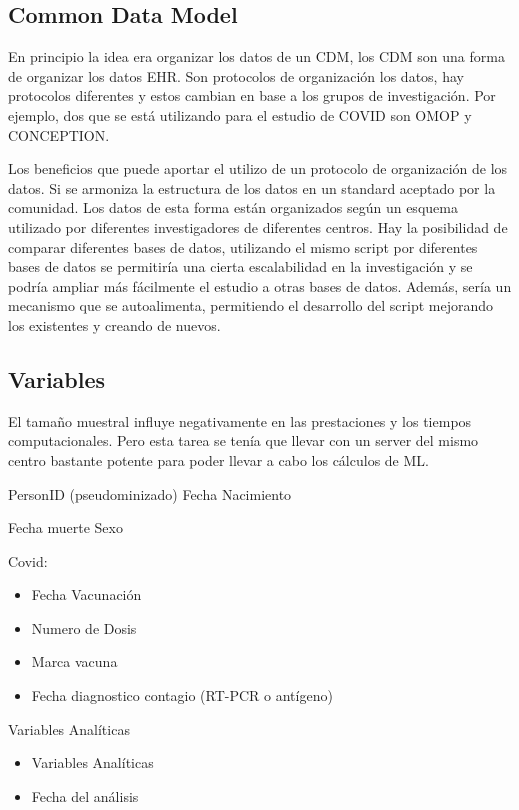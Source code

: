 \documentclass[
]{article}
\begin{document}
\hypertarget{common-data-model}{%
\subsection{Common Data Model}\label{common-data-model}}

En principio la idea era organizar los datos de un CDM, los CDM son una
forma de organizar los datos EHR. Son protocolos de organización los
datos, hay protocolos diferentes y estos cambian en base a los grupos de
investigación. Por ejemplo, dos que se está utilizando para el estudio
de COVID son OMOP y CONCEPTION.

Los beneficios que puede aportar el utilizo de un protocolo de
organización de los datos. Si se armoniza la estructura de los datos en
un standard aceptado por la comunidad. Los datos de esta forma están
organizados según un esquema utilizado por diferentes investigadores de
diferentes centros. Hay la posibilidad de comparar diferentes bases de
datos, utilizando el mismo script por diferentes bases de datos se
permitiría una cierta escalabilidad en la investigación y se podría
ampliar más fácilmente el estudio a otras bases de datos. Además, sería
un mecanismo que se autoalimenta, permitiendo el desarrollo del script
mejorando los existentes y creando de nuevos.

\hypertarget{variables-1}{%
\subsection{Variables}\label{variables-1}}

El tamaño muestral influye negativamente en las prestaciones y los
tiempos computacionales. Pero esta tarea se tenía que llevar con un
server del mismo centro bastante potente para poder llevar a cabo los
cálculos de ML.

PersonID (pseudominizado) Fecha Nacimiento

Fecha muerte Sexo

Covid:

\begin{itemize}
\item
  Fecha Vacunación
\item
  Numero de Dosis
\item
  Marca vacuna
\item
  Fecha diagnostico contagio (RT-PCR o antígeno)
\end{itemize}

Variables Analíticas

\begin{itemize}
\item
  Variables Analíticas
\item
  Fecha del análisis
\end{itemize}
\end{document}
